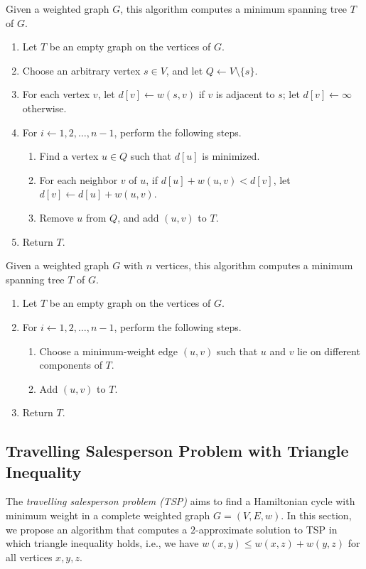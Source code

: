 \documentclass[11pt]{article}
\begin{document}
\begin{algorithm}[Prim]
  Given a weighted graph $G$, this algorithm computes a minimum spanning tree $T$ of $G$.
  \begin{enumerate}[label*=\arabic*.]
    \item Let $T$ be an empty graph on the vertices of $G$.
    \item Choose an arbitrary vertex $s \in V$, and let $Q \gets V \setminus \{s\}$.
    \item For each vertex $v$, let $d[v] \gets w(s, v)$ if $v$ is adjacent to $s$; let $d[v] \gets \infty$ otherwise.
    \item For $i \gets 1, 2, \dots, n-1$, perform the following steps.
    \begin{enumerate}[label*=\arabic*.]
      \item Find a vertex $u \in Q$ such that $d[u]$ is minimized.
      \item For each neighbor $v$ of $u$, if $d[u] + w(u, v) < d[v]$, let $d[v] \gets d[u] + w(u, v)$.
      \item Remove $u$ from $Q$, and add $(u, v)$ to $T$.
    \end{enumerate}
    \item Return $T$.
  \end{enumerate}
\end{algorithm}

\begin{algorithm}[Kruskal]
  Given a weighted graph $G$ with $n$ vertices, this algorithm computes a minimum spanning tree $T$ of $G$.
  \begin{enumerate}[label*=\arabic*.]
    \item Let $T$ be an empty graph on the vertices of $G$.
    \item For $i \gets 1, 2, \dots, n-1$, perform the following steps.
    \begin{enumerate}[label*=\arabic*.]
      \item Choose a minimum-weight edge $(u, v)$ such that $u$ and $v$ lie on different components of $T$.
      \item Add $(u, v)$ to $T$.
    \end{enumerate}
    \item Return $T$.
  \end{enumerate}
\end{algorithm}

\subsection{Travelling Salesperson Problem with Triangle Inequality}
The \emph{travelling salesperson problem (TSP)} aims to find a Hamiltonian cycle with minimum weight in a complete weighted graph $G = (V, E, w)$.
In this section, we propose an algorithm that computes a $2$-approximate solution to TSP in which triangle inequality holds, i.e., we have $w(x, y) \leq w(x, z) + w(y, z)$ for all vertices $x, y, z$.
\end{document}
